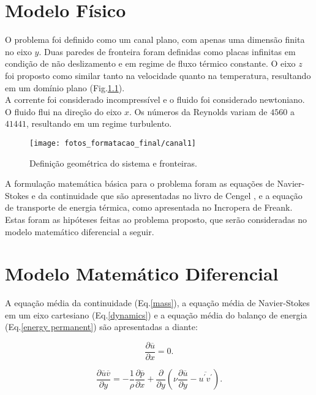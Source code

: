 
\chapter{Modelo Físico}

O problema foi definido como um canal plano, com apenas uma dimensão finita no eixo $ y $. Duas paredes de fronteira foram definidas como placas infinitas em condição de não deslizamento e em regime de fluxo térmico constante. O eixo $ z $ foi proposto como similar tanto na velocidade quanto na temperatura, resultando em um domínio plano (Fig.\ref{figure.1}). \\
A corrente foi considerado incompressível e o fluido foi considerado newtoniano. O fluido flui na direção do eixo $ x $. Os números da Reynolds variam de $ 4560 $ a $ 41441 $, resultando em um regime turbulento.

\begin{figure}[h!]
	\centering
	\texttt{[image: fotos\_formatacao\_final/canal1]}
	\caption{Definição geométrica do sistema e fronteiras.}
	\label{figure.1}
\end{figure}

A formulação matemática básica para o problema foram as equações de Navier-Stokes e da continuidade que são apresentadas no livro de Cengel \cite{Cengel}, e a equação de transporte de energia térmica, como apresentada no Incropera \cite{Incropera} de Freank. Estas foram as hipóteses feitas ao problema proposto, que serão consideradas no modelo matemático diferencial a seguir.



\chapter{Modelo Matemático Diferencial}
A equação média da continuidade (Eq.\ref{mass}), a equação média de Navier-Stokes em um eixo cartesiano (Eq.\ref{dynamics}) e a equação média do balanço de energia (Eq.\ref{energy permanent}) são apresentadas a diante: 


\begin{equation}\label{mass}
\frac{\partial \overline{u}}{\partial x} = 0.
\end{equation}

\begin{equation}\label{dynamics}
\frac{\partial \overline{u}\overline{v}}{\partial y} = 
- \frac{1}{\rho} \frac{\partial \overline{p}}{\partial x} + \frac{\partial}{\partial y}\left(\nu \frac{\partial \overline{u}}{\partial y} - \overline{u^\prime v^\prime}\right).
\end{equation}


